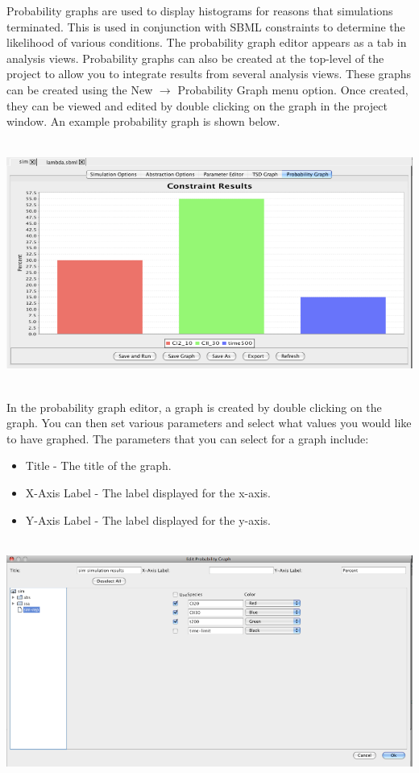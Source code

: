 \documentclass[titlepage,11pt]{article}
\begin{document}
\noindent
Probability graphs are used to display histograms for reasons that
simulations terminated.  This is used in conjunction with SBML constraints
to determine the likelihood of various conditions. 
The probability graph editor appears as a tab in analysis
views.  Probability graphs can also be created at the top-level of the project
to allow you to integrate results from several analysis views. 
These graphs can be created using the New $\rightarrow$ Probability Graph
menu option. Once created, they can be viewed and edited by double
clicking on the graph in the project window.  An example probability
graph is shown below.
\begin{center}
\includegraphics[height=80mm]{screenshots/probGraph}
\end{center}

In the probability graph editor,
a graph is created by double clicking on the graph. You can then set
various parameters and select what values you would like to have
graphed. The parameters that you can select for a graph include: 
\begin{itemize}
\item Title - The title of the graph.
\item X-Axis Label - The label displayed for the x-axis. 
\item Y-Axis Label - The label displayed for the y-axis. 
\end{itemize}
\begin{center}
\includegraphics[height=80mm]{screenshots/editProbGraph}
\end{center}
\end{document}

